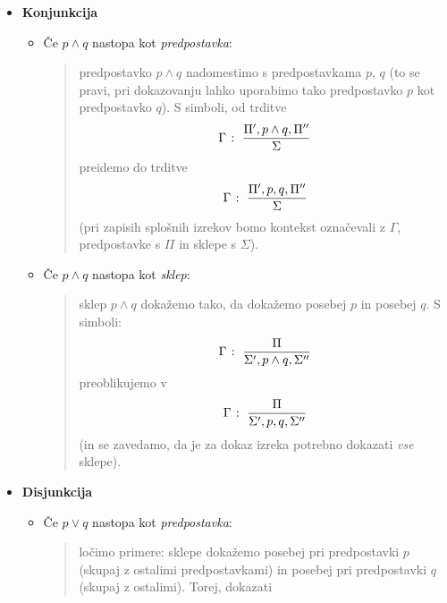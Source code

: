         \begin{itemize}
                \item\textbf{Konjunkcija}
                        \begin{itemize}
                                \item
                                        Če $p \land q$ nastopa kot \emph{predpostavka}:
                                        \begin{quote}
                                                predpostavko $p \land q$ nadomestimo s predpostavkama $p$, $q$ (to se pravi, pri dokazovanju lahko uporabimo tako predpostavko $p$ kot predpostavko $q$). S simboli, od trditve
                                                \[{\Gamma} \;\colon\; \frac{\Pi', p \land q, \Pi''}{\Sigma}\]
                                                preidemo do trditve
                                                \[{\Gamma} \;\colon\; \frac{\Pi', p, q, \Pi''}{\Sigma}\]
                                                (pri zapisih splošnih izrekov bomo kontekst označevali z $\Gamma$, predpostavke s $\Pi$ in sklepe s $\Sigma$).
                                        \end{quote}
                                \item
                                        Če $p \land q$ nastopa kot \emph{sklep}:
                                        \begin{quote}
                                                sklep $p \land q$ dokažemo tako, da dokažemo posebej $p$ in posebej $q$. S simboli:
                                                \[{\Gamma} \;\colon\; \frac{\Pi}{\Sigma', p \land q, \Sigma''}\]
                                                preoblikujemo v
                                                \[{\Gamma} \;\colon\; \frac{\Pi}{\Sigma', p, q, \Sigma''}\]
                                                (in se zavedamo, da je za dokaz izreka potrebno dokazati \emph{vse} sklepe).
                                        \end{quote}
                        \end{itemize}
                \item\textbf{Disjunkcija}
                        \begin{itemize}
                                \item
                                        Če $p \lor q$ nastopa kot \emph{predpostavka}:
                                        \begin{quote}
                                                ločimo primere: sklepe dokažemo posebej pri predpostavki $p$ (skupaj z ostalimi predpostavkami) in posebej pri predpostavki $q$ (skupaj z ostalimi). Torej, dokazati

\end{quote}
\end{itemize}
\end{itemize}

